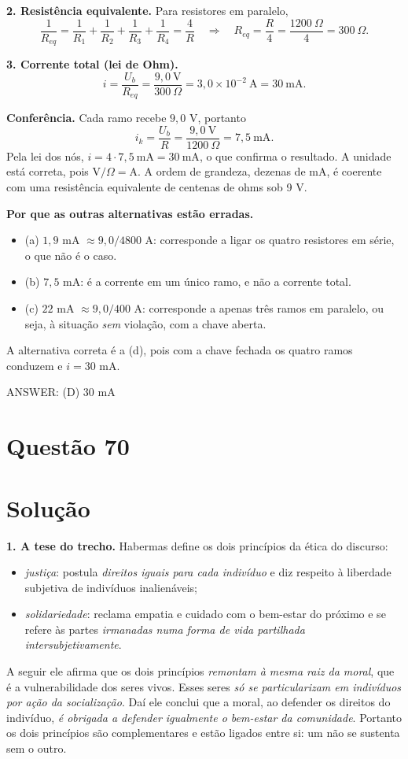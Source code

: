 \documentclass{article}%
\begin{document}
\textbf{2. Resistência equivalente.} Para resistores em paralelo,
\[
\frac{1}{R_{eq}}=\frac{1}{R_1}+\frac{1}{R_2}+\frac{1}{R_3}+\frac{1}{R_4}=\frac{4}{R}
\quad\Longrightarrow\quad
R_{eq}=\frac{R}{4}=\frac{1200\ \Omega}{4}=300\ \Omega .
\]

\textbf{3. Corrente total (lei de Ohm).}
\[
i=\frac{U_b}{R_{eq}}=\frac{9{,}0\ \text{V}}{300\ \Omega}=3{,}0\times 10^{-2}\ \text{A}=30\ \text{mA}.
\]

\textbf{Conferência.} Cada ramo recebe $9{,}0$ V, portanto
\[
i_k=\frac{U_b}{R}=\frac{9{,}0\ \text{V}}{1200\ \Omega}=7{,}5\ \text{mA}.
\]
Pela lei dos nós, $i=4\cdot 7{,}5\ \text{mA}=30\ \text{mA}$, o que confirma o resultado. A unidade está correta, pois $\text{V}/\Omega=\text{A}$. A ordem de grandeza, dezenas de mA, é coerente com uma resistência equivalente de centenas de ohms sob 9 V.

\textbf{Por que as outras alternativas estão erradas.}
\begin{itemize}
\item (a) $1{,}9$ mA $\approx 9{,}0/4800$ A: corresponde a ligar os quatro resistores em série, o que não é o caso.
\item (b) $7{,}5$ mA: é a corrente em um único ramo, e não a corrente total.
\item (c) $22$ mA $\approx 9{,}0/400$ A: corresponde a apenas três ramos em paralelo, ou seja, à situação \emph{sem} violação, com a chave aberta.
\end{itemize}
A alternativa correta é a (d), pois com a chave fechada os quatro ramos conduzem e $i=30$ mA.

ANSWER: (D) 30 mA%
\newpage%
\section*{Questão 70}

\section*{Solução}

\textbf{1. A tese do trecho.} Habermas define os dois princípios da ética do discurso:
\begin{itemize}
\item \emph{justiça}: postula \emph{direitos iguais para cada indivíduo} e diz respeito à liberdade subjetiva de indivíduos inalienáveis;
\item \emph{solidariedade}: reclama empatia e cuidado com o bem-estar do próximo e se refere às partes \emph{irmanadas numa forma de vida partilhada intersubjetivamente}.
\end{itemize}
A seguir ele afirma que os dois princípios \emph{remontam à mesma raiz da moral}, que é a vulnerabilidade dos seres vivos. Esses seres \emph{só se particularizam em indivíduos por ação da socialização}. Daí ele conclui que a moral, ao defender os direitos do indivíduo, \emph{é obrigada a defender igualmente o bem-estar da comunidade}. Portanto os dois princípios são complementares e estão ligados entre si: um não se sustenta sem o outro.
\end{document}
